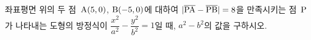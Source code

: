 좌표평면 위의 두 점~$\mathrm{A}(5{,}\mkern3mu\mathopen{}0)$, $\mathrm{B}(-5{,}\mkern3mu\mathopen{}0)$에 대하여 $|\overline{\mathrm{PA}}-\overline{\mathrm{PB}}|=8$을 만족시키는 점~$\mathrm{P}$가 나타내는 도형의 방정식이 $\dfrac{x^2}{a^2}-\dfrac{y^2}{b^2}=1$일 때, $a^2-b^2$의 값을 구하시오. 

